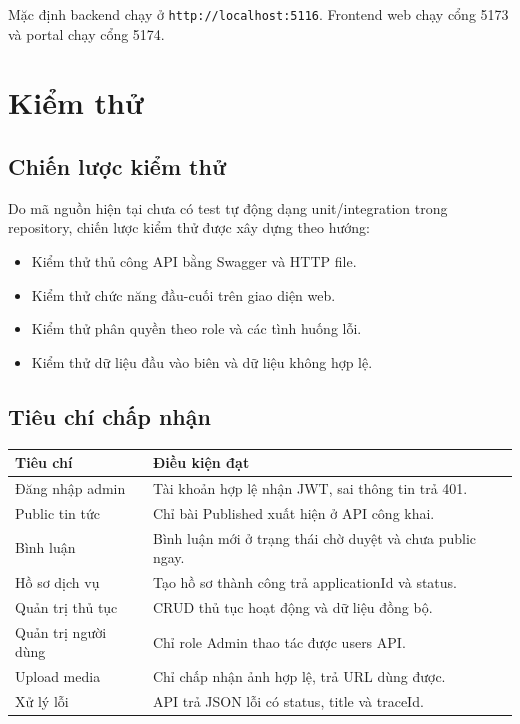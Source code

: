 \documentclass[12pt,a4paper]{article}
\begin{document}
Mặc định backend chạy ở \texttt{http://localhost:5116}. Frontend web chạy cổng 5173 và portal chạy cổng 5174.

\newpage

\section{Kiểm thử}

\subsection{Chiến lược kiểm thử}
Do mã nguồn hiện tại chưa có test tự động dạng unit/integration trong repository, chiến lược kiểm thử được xây dựng theo hướng:
\begin{itemize}[leftmargin=1.1cm]
  \item Kiểm thử thủ công API bằng Swagger và HTTP file.
  \item Kiểm thử chức năng đầu-cuối trên giao diện web.
  \item Kiểm thử phân quyền theo role và các tình huống lỗi.
  \item Kiểm thử dữ liệu đầu vào biên và dữ liệu không hợp lệ.
\end{itemize}

\subsection{Tiêu chí chấp nhận}
\begin{longtable}{p{4.1cm}p{9.4cm}}
\toprule
\textbf{Tiêu chí} & \textbf{Điều kiện đạt} \\
\midrule
Đăng nhập admin & Tài khoản hợp lệ nhận JWT, sai thông tin trả 401. \\
Public tin tức & Chỉ bài Published xuất hiện ở API công khai. \\
Bình luận & Bình luận mới ở trạng thái chờ duyệt và chưa public ngay. \\
Hồ sơ dịch vụ & Tạo hồ sơ thành công trả applicationId và status. \\
Quản trị thủ tục & CRUD thủ tục hoạt động và dữ liệu đồng bộ. \\
Quản trị người dùng & Chỉ role Admin thao tác được users API. \\
Upload media & Chỉ chấp nhận ảnh hợp lệ, trả URL dùng được. \\
Xử lý lỗi & API trả JSON lỗi có status, title và traceId. \\
\bottomrule
\end{longtable}
\end{document}
